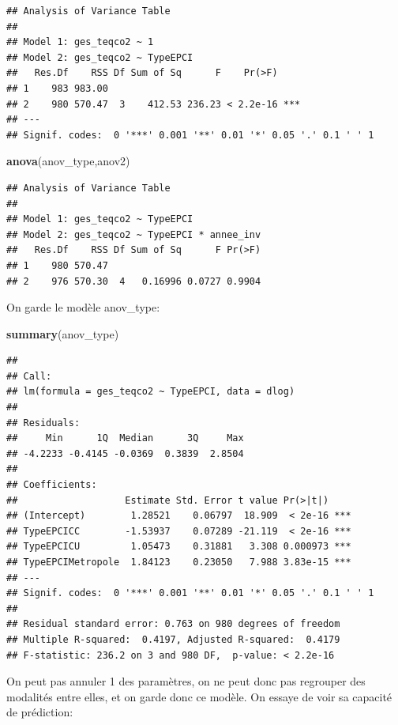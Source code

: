 \documentclass[
]{article}
\newenvironment{Shaded}{\begin{snugshade}}{\end{snugshade}}
\newcommand{\FunctionTok}[1]{\textcolor[rgb]{0.13,0.29,0.53}{\textbf{#1}}}
\newcommand{\NormalTok}[1]{#1}
\begin{document}
\begin{verbatim}
## Analysis of Variance Table
## 
## Model 1: ges_teqco2 ~ 1
## Model 2: ges_teqco2 ~ TypeEPCI
##   Res.Df    RSS Df Sum of Sq      F    Pr(>F)    
## 1    983 983.00                                  
## 2    980 570.47  3    412.53 236.23 < 2.2e-16 ***
## ---
## Signif. codes:  0 '***' 0.001 '**' 0.01 '*' 0.05 '.' 0.1 ' ' 1
\end{verbatim}

\begin{Shaded}
\begin{Highlighting}[]
\FunctionTok{anova}\NormalTok{(anov\_type,anov2)}
\end{Highlighting}
\end{Shaded}

\begin{verbatim}
## Analysis of Variance Table
## 
## Model 1: ges_teqco2 ~ TypeEPCI
## Model 2: ges_teqco2 ~ TypeEPCI * annee_inv
##   Res.Df    RSS Df Sum of Sq      F Pr(>F)
## 1    980 570.47                           
## 2    976 570.30  4   0.16996 0.0727 0.9904
\end{verbatim}

On garde le modèle anov\_type:

\begin{Shaded}
\begin{Highlighting}[]
\FunctionTok{summary}\NormalTok{(anov\_type)}
\end{Highlighting}
\end{Shaded}

\begin{verbatim}
## 
## Call:
## lm(formula = ges_teqco2 ~ TypeEPCI, data = dlog)
## 
## Residuals:
##     Min      1Q  Median      3Q     Max 
## -4.2233 -0.4145 -0.0369  0.3839  2.8504 
## 
## Coefficients:
##                   Estimate Std. Error t value Pr(>|t|)    
## (Intercept)        1.28521    0.06797  18.909  < 2e-16 ***
## TypeEPCICC        -1.53937    0.07289 -21.119  < 2e-16 ***
## TypeEPCICU         1.05473    0.31881   3.308 0.000973 ***
## TypeEPCIMetropole  1.84123    0.23050   7.988 3.83e-15 ***
## ---
## Signif. codes:  0 '***' 0.001 '**' 0.01 '*' 0.05 '.' 0.1 ' ' 1
## 
## Residual standard error: 0.763 on 980 degrees of freedom
## Multiple R-squared:  0.4197, Adjusted R-squared:  0.4179 
## F-statistic: 236.2 on 3 and 980 DF,  p-value: < 2.2e-16
\end{verbatim}

On peut pas annuler 1 des paramètres, on ne peut donc pas regrouper des
modalités entre elles, et on garde donc ce modèle. On essaye de voir sa
capacité de prédiction:
\end{document}
